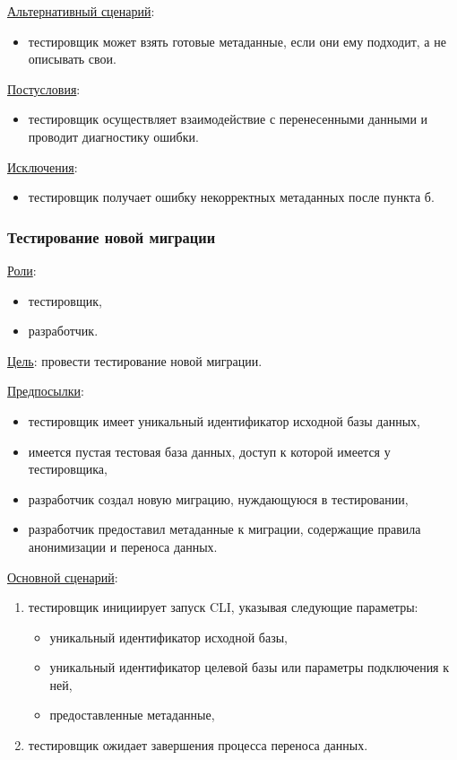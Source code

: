 \underline{Альтернативный сценарий}:

\begin{itemize}
    \item тестировщик может взять готовые метаданные, если они ему подходит, а не описывать свои.
\end{itemize}

\underline{Постусловия}:

\begin{itemize}
    \item тестировщик осуществляет взаимодействие с перенесенными данными и проводит диагностику ошибки.
\end{itemize}

\underline{Исключения}:

\begin{itemize}
    \item тестировщик получает ошибку некорректных метаданных после пункта б.
\end{itemize}


\subsubsection{Тестирование новой миграции}

\underline{Роли}:

\begin{itemize}
    \item тестировщик,
    \item разработчик.
\end{itemize}

\underline{Цель}: провести тестирование новой миграции.

\underline{Предпосылки}:

\begin{itemize}
    \item тестировщик имеет уникальный идентификатор исходной базы данных,
    \item имеется пустая тестовая база данных, доступ к которой имеется у тестировщика,
    \item разработчик создал новую миграцию, нуждающуюся в тестировании,
    \item разработчик предоставил метаданные к миграции, содержащие правила анонимизации и переноса данных.
\end{itemize}

\underline{Основной сценарий}:

\begin{enumerate}
    \item тестировщик инициирует запуск CLI, указывая следующие параметры:
    \begin{itemize}
        \item уникальный идентификатор исходной базы,
        \item уникальный идентификатор целевой базы или параметры подключения к ней,
        \item предоставленные метаданные,
    \end{itemize}
    \item тестировщик ожидает завершения процесса переноса данных.
\end{enumerate}

